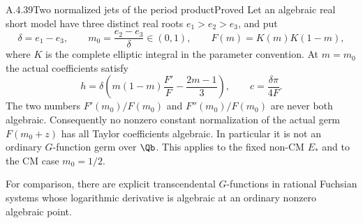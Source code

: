 \begin{result}{A.4.39}{Two normalized jets of the period product}{Proved}
Let an algebraic real short model have three distinct real roots
$e_1>e_2>e_3$, and put
\[
 \delta=e_1-e_3,\qquad m_0=\frac{e_2-e_3}{\delta}\in(0,1),
 \qquad F(m)=K(m)K(1-m),
\]
where $K$ is the complete elliptic integral in the parameter
convention. At $m=m_0$ the actual coefficients satisfy
\[
 h=\delta\left(m(1-m)\frac{F'}F-\frac{2m-1}{3}\right),
 \qquad c=\frac{\delta\pi}{4F}.
\]
The two numbers $F'(m_0)/F(m_0)$ and $F''(m_0)/F(m_0)$ are never
both algebraic. Consequently no nonzero constant normalization of
the actual germ $F(m_0+z)$ has all Taylor coefficients algebraic.
In particular it is not an ordinary $G$-function germ over $\Qb$.
This applies to the fixed non-CM $E_*$ and to the CM case $m_0=1/2$.

For comparison, there are explicit transcendental $G$-functions in
rational Fuchsian systems whose logarithmic derivative is algebraic
at an ordinary nonzero algebraic point.
\end{result}

